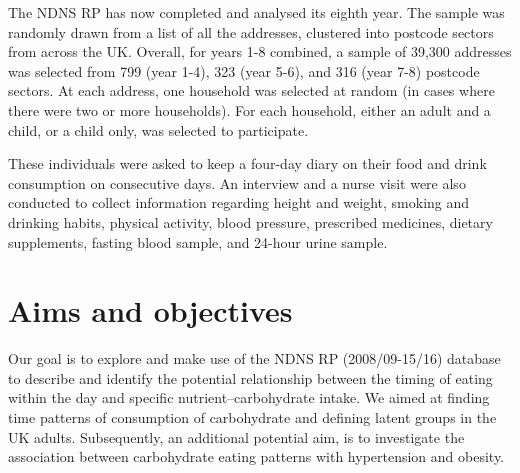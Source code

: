 The NDNS RP has now completed and analysed its eighth year. The sample was randomly drawn from a list of all the addresses, clustered into postcode sectors from across the UK. Overall, for years 1-8 combined, a sample of 39,300 addresses was selected from 799 (year 1-4), 323 (year 5-6), and 316 (year 7-8) postcode sectors. At each address, one household was selected at random (in cases where there were two or more households). For each household, either an adult and a child, or a child only, was selected to participate. 

These individuals were asked to keep a four-day diary on their food and drink consumption on consecutive days. An interview and a nurse visit were also conducted to collect information regarding height and weight, smoking and drinking habits, physical activity, blood pressure, prescribed medicines, dietary supplements, fasting blood sample, and 24-hour urine sample. \vspace{-0.3cm}

\section{Aims and objectives}\vspace{-0.3cm}


Our goal is to explore and make use of the NDNS RP (2008/09-15/16) database to describe and identify the potential relationship between the timing of eating within the day and specific nutrient--carbohydrate intake. We aimed at finding time patterns of consumption of carbohydrate and defining latent groups in the UK adults. Subsequently, an additional potential aim, is to investigate the association between carbohydrate eating patterns with hypertension and obesity.

